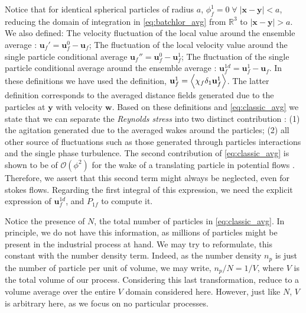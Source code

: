 Notice that for identical spherical particles of radius $a$, $\phi_f^1 = 0\; \forall \;|\textbf{x}-\textbf{y}| < a$, reducing the domain of integration in \ref{eq:batchlor_avg} from $\mathbb{R}^3$ to $|\textbf{x}-\textbf{y}| > a$. 
We also defined: 
The velocity fluctuation of the local value around the ensemble average : $\textbf{u}_f' = \textbf{u}_f^0 - \textbf{u}_f$;
The fluctuation of the local velocity value around the single particle conditional average $\textbf{u}_f'' = \textbf{u}_f^0 - \textbf{u}_f^1$;
The fluctuation of the single particle conditional average around the ensemble average : $\textbf{u}_f^{1d} = \textbf{u}_f^1 - \textbf{u}_f$.
In these definitions we have used the definition, $\textbf{u}_f^1 =\left<\chi_f \delta_1 \textbf{u}_f^1\right>$.  
The latter definition corresponds to the averaged distance fields generated due to the particles at $\textbf{y}$ with velocity $\textbf{w}$. 
Based on these definitions and \ref{eq:classic_avg} we state that we can separate the \textit{Reynolds stress} into two distinct contribution :  (1) the agitation generated due to the averaged wakes around the particles; (2) all other source of fluctuations such as those generated through particles interactions and the single phase turbulence. 
The second contribution of \ref{eq:classic_avg} is shown to be of $\mathcal{O}(\phi^2)$ for the wake of a translating particle in potential flows \citet[Appendix A]{zhang1994averaged}.
Therefore, we assert that this second term might always be neglected, even for stokes flows. 
Regarding the first integral of this expression, we need the explicit expression of $\textbf{u}_f^{1d}$, and $P_{1f}$ to compute it.

Notice the presence of $N$, the total number of particles in \ref{eq:classic_avg}. 
In principle, we do not have this information, as millions of particles might be present in the industrial process at hand. 
We may try to reformulate, this constant with the number density term. 
Indeed, as the number density $n_p$ is just the number of particle per unit of volume, we may write, $n_p / N = 1/V$, where $V$ is the total volume of our process. 
Considering this last transformation, \citet{eq:classic_avg} reduce to a volume average over the entire $V$ domain considered here. 
However, just like $N$, $V$ is arbitrary here, as we focus on no particular processes. 

